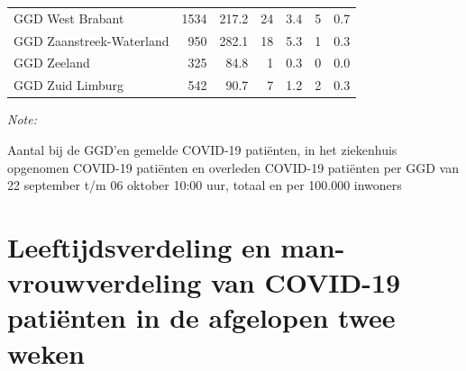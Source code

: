 \documentclass[
  english,
  man,floatsintext]{apa6}
\begin{document}
\begin{table}[H]
\begin{threeparttable}
\begin{tabular}{lrrrrrr}
GGD West Brabant & 1534 & 217.2 & 24 & 3.4 & 5 & 0.7\\
GGD Zaanstreek-Waterland & 950 & 282.1 & 18 & 5.3 & 1 & 0.3\\
GGD Zeeland & 325 & 84.8 & 1 & 0.3 & 0 & 0.0\\
GGD Zuid Limburg & 542 & 90.7 & 7 & 1.2 & 2 & 0.3\\
\bottomrule
\end{tabular}
\begin{tablenotes}
\item \textit{Note: } 
\item Aantal bij de GGD’en gemelde COVID-19 patiënten, in het ziekenhuis opgenomen COVID-19 patiënten en overleden COVID-19 patiënten per GGD van 22 september t/m 06 oktober 10:00 uur, totaal en per 100.000 inwoners
\end{tablenotes}
\end{threeparttable}
\endgroup{}
\end{table}

\newpage

\hypertarget{leeftijdsverdeling-en-man-vrouwverdeling-van-covid-19-patiuxebnten-in-de-afgelopen-twee-weken}{%
\section{Leeftijdsverdeling en man-vrouwverdeling van COVID-19 patiënten in de afgelopen twee weken}\label{leeftijdsverdeling-en-man-vrouwverdeling-van-covid-19-patiuxebnten-in-de-afgelopen-twee-weken}}
\end{document}
